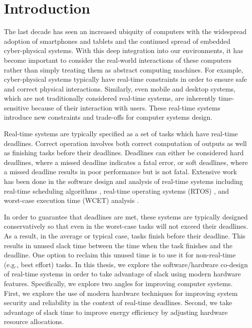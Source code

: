 \chapter{Introduction}
\label{chap:intro}

The last decade has seen an increased ubiquity of computers with the widespread
adoption of smartphones and tablets and the continued spread of embedded
cyber-physical systems. With this deep integration into our environments, it has
become important to consider the real-world interactions of these computers
rather than simply treating them as abstract computing machines. For example,
cyber-physical systems typically have real-time constraints in order to ensure
safe and correct physical interactions. Similarly, even mobile and desktop
systems, which are not traditionally considered real-time systems, are
inherently time-sensitive because of their interaction with users.
These real-time systems introduce new constraints and trade-offs for computer
systems design.

Real-time systems are typically specified as a set of tasks which have
real-time deadlines. Correct operation involves both correct computation of
outputs as well as finishing tasks before their deadlines.  Deadlines can
either be considered hard deadlines, where a missed deadline indicates a fatal
error, or soft deadlines, where a missed deadline results in poor performance
but is not fatal. Extensive work has been done in the software design and
analysis of real-time systems including real-time scheduling algorithms
\cite{rtschedulingsurvey-csur11}, real-time operating systems (RTOS)
\cite{rtossurvey-micro09, rtossurvey-icesc14}, and worst-case execution time
(WCET) analysis \cite{wcetsurvey-tecs08}.

In order to guarantee that deadlines are met, these systems are typically
designed conservatively so that even in the worst-case tasks will not exceed
their deadlines. As a result, in the average or typical case, tasks finish
before their deadline. This results in unused slack time between the time when the task 
finishes and the deadline. One option to reclaim this unused time is to use it
for non-real-time (e.g., best effort) tasks. In this thesis, we explore the
software/hardware co-design of real-time systems in order to take advantage of
slack using modern hardware features. Specifically, we explore two angles for
improving computer systems. First, we explore the use of modern hardware
techniques for improving system security and reliability in the context of
real-time deadlines. Second, we take advantage of slack time to improve energy
efficiency by adjusting hardware resource allocations.

